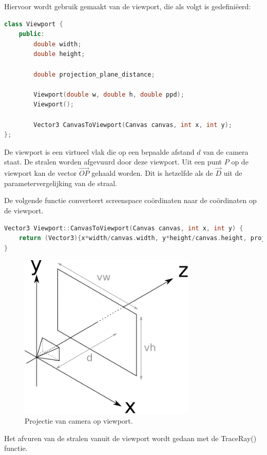 \documentclass[12pt, a4paper]{article}
\begin{document}
Hiervoor wordt gebruik gemaakt van de viewport, die als volgt is gedefiniëerd:
\begin{lstlisting}[language=C++]
class Viewport {
    public:
        double width;
        double height;

        double projection_plane_distance;

        Viewport(double w, double h, double ppd);
        Viewport();

        Vector3 CanvasToViewport(Canvas canvas, int x, int y);
};
\end{lstlisting}

De viewport is een virtueel vlak die op een bepaalde afstand $d$ van de camera staat. De stralen worden afgevuurd door deze viewport. Uit een punt $P$ op de viewport kan de vector $\vec{OP}$ gehaald worden. Dit is hetzelfde als de $\vec{D}$ uit de parametervergelijking van de straal.

De volgende functie converteert screenspace coördinaten naar de coördinaten op de viewport.
\begin{lstlisting}[language=C++]
Vector3 Viewport::CanvasToViewport(Canvas canvas, int x, int y) {
    return (Vector3){x*width/canvas.width, y*height/canvas.height, projection_plane_distance};
}
\end{lstlisting}

\begin{figure}[H]
    \centering
    \includegraphics[width=0.75\textwidth]{viewport.png}
    \caption{Projectie van camera op viewport.}
    \label{fig:viewport}
\end{figure}

Het afvuren van de stralen vanuit de viewport wordt gedaan met de TraceRay() functie.
\end{document}
